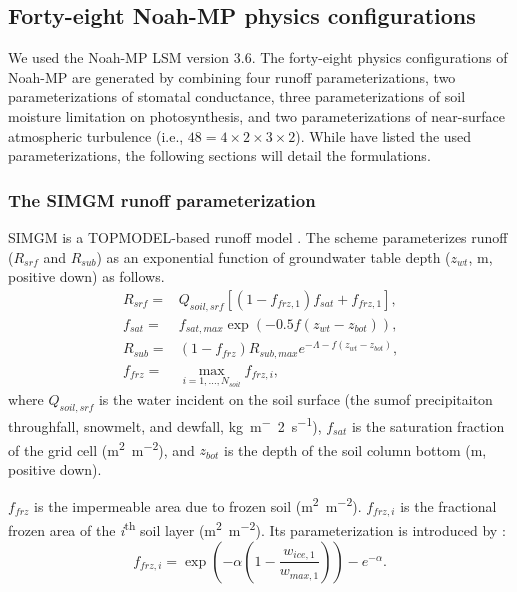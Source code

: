 \documentclass[essd]{copernicus}
\begin{document}
\subsection{Forty-eight Noah-MP physics configurations} \label{sec:data:noahmp}

We used the Noah-MP LSM version 3.6. The forty-eight physics configurations of
Noah-MP are generated by combining four runoff parameterizations, two
parameterizations of stomatal conductance, three parameterizations of soil
moisture limitation on photosynthesis, and two parameterizations of near-surface
atmospheric turbulence (i.e., \(48 = 4 \times 2 \times 3 \times 2\)). While
\citet[Table 1]{zheng2019WRR} have listed the used parameterizations, the
following sections will detail the formulations.

\subsubsection{The SIMGM runoff parameterization}

SIMGM is a TOPMODEL-based runoff model \citep{niu2007JGRA}. The scheme
parameterizes runoff (\(R_{srf}\) and \(R_{sub}\)) as an exponential function of
groundwater table depth (\(z_{wt}\), m, positive down) as follows.
\begin{align}
  R_{srf} = & Q_{soil,srf} [(1 - f_{frz,1}) f_{sat} + f_{frz,1} ]
  \text{,} \label{eq:SIMGM:rsrf} \\
  f_{sat} = & f_{sat,max} \exp(-0.5 f (z_{wt} - z_{bot}))
  \text{,} \label{eq:SIMGM:fsat} \\
  R_{sub} = & (1 - f_{frz}) R_{sub,max} e^{-\Lambda - f(z_{wt} - z_{bot})}
  \text{,} \label{eq:SIMGM:rsub} \\
  f_{frz} = & \max_{i=1,\dots,N_{soil}} f_{frz,i}
  \text{,} \label{eq:SIMGM:ffrzmax}
\end{align}
where \(Q_{soil,srf}\) is the water incident on the soil surface (the sumof
precipitaiton throughfall, snowmelt, and dewfall, \si{kg~m^-2~s^{-1}}),
\(f_{sat}\) is the saturation fraction of the grid cell (\si{m^2~m^{-2}}), and
\(z_{bot}\) is the depth of the soil column bottom (\si{m}, positive down).

\(f_{frz}\) is the impermeable area due to frozen soil (\si{m^2~m^{-2}}).
\(f_{frz,i}\) is the fractional frozen area of the
\textit{i}\textsuperscript{th} soil layer (\si{m^2~m^{-2}}). Its
parameterization is introduced by \citet{niu2006JH}:
\begin{equation}
  f_{frz,i} = \exp\left(-\alpha(1 - \frac{w_{ice,1}}{w_{max,1}})\right) -
  e^{-\alpha} \text{.}
\end{equation}
\end{document}

